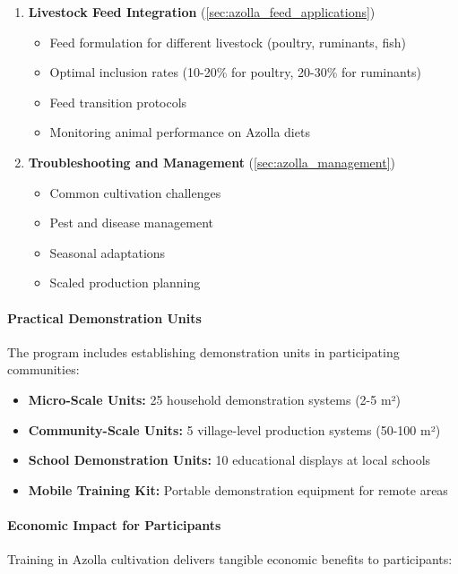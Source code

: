 \begin{enumerate}
    \item \textbf{Livestock Feed Integration} (\ref{sec:azolla_feed_applications})
    \begin{itemize}
        \item Feed formulation for different livestock (poultry, ruminants, fish)
        \item Optimal inclusion rates (10-20\% for poultry, 20-30\% for ruminants)
        \item Feed transition protocols
        \item Monitoring animal performance on Azolla diets
    \end{itemize}
    
    \item \textbf{Troubleshooting and Management} (\ref{sec:azolla_management})
    \begin{itemize}
        \item Common cultivation challenges
        \item Pest and disease management
        \item Seasonal adaptations
        \item Scaled production planning
    \end{itemize}
\end{enumerate}

\paragraph{Practical Demonstration Units}
The program includes establishing demonstration units in participating communities:

\begin{itemize}
    \item \textbf{Micro-Scale Units:} 25 household demonstration systems (2-5 m²)
    \item \textbf{Community-Scale Units:} 5 village-level production systems (50-100 m²)
    \item \textbf{School Demonstration Units:} 10 educational displays at local schools
    \item \textbf{Mobile Training Kit:} Portable demonstration equipment for remote areas
\end{itemize}

\paragraph{Economic Impact for Participants}
Training in Azolla cultivation delivers tangible economic benefits to participants:

